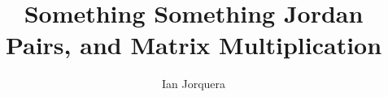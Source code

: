 \documentclass{article}
\title{Something Something Jordan Pairs, and Matrix Multiplication}
\author{Ian Jorquera}
\begin{document}
\maketitle







\nocite{*}


\end{document}
